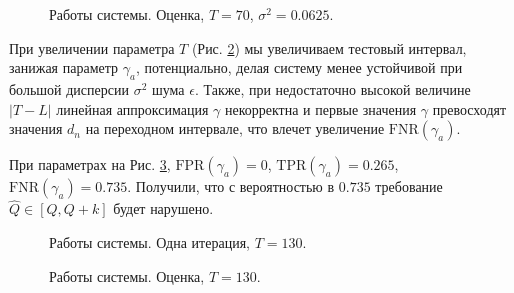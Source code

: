 \documentclass[specialist, substylefile = spbu.rtx,
			   subf, href, 12pt]{disser}
\begin{document}
\begin{figure}[!hhh]
	\caption{Работы системы. Оценка, $ T = 70 $, $ \sigma^2=0.0625 $.}
	\label{pic:system_estimation_t=70_small_sd}
\end{figure}


\newpage
При увеличении параметра $ T $ (Рис. \ref{pic:system_estimation_one_iter_t=130}) мы увеличиваем тестовый интервал, занижая параметр $ \gamma_a $, потенциально, делая систему менее устойчивой при большой дисперсии $ \sigma^2 $ шума $ \epsilon $. Также, при недостаточно высокой величине $ |T - L| $ линейная аппроксимация $ \gamma $ некорректна и первые значения $ \gamma $ превосходят значения $ d_n $ на переходном интервале, что влечет увеличение $ \mathrm{FNR}(\gamma_a) $.

При параметрах на Рис. \ref{pic:system_estimation_t=130}, $ \mathrm{FPR}(\gamma_a) = 0 $, $ \mathrm{TPR}(\gamma_a) = 0.265 $, $ \mathrm{FNR}(\gamma_a) = 0.735 $. Получили, что с вероятностью в $ 0.735 $ требование $ \hat{Q} \in [Q, Q+k] $ будет нарушено.


\begin{figure}[!hhh]
	\caption{Работы системы. Одна итерация, $ T = 130 $.}
	\label{pic:system_estimation_one_iter_t=130}
\end{figure}

\begin{figure}[!hhh]
	\caption{Работы системы. Оценка, $ T = 130 $.}
	\label{pic:system_estimation_t=130}
\end{figure}
\end{document}
